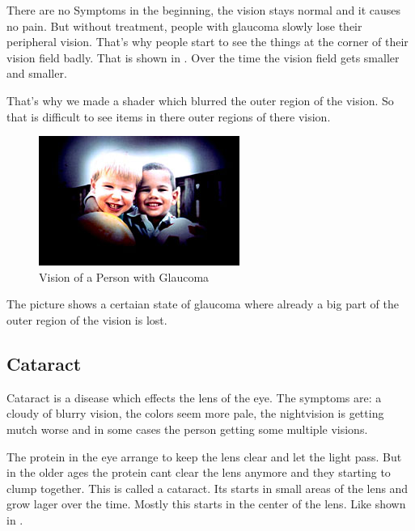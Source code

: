 \documentclass{sig-alternate-05-2015}
\begin{document}
There are no Symptoms in the beginning, the vision stays normal and it causes no pain. But without treatment, people with glaucoma slowly lose their peripheral vision. That's why people start to see the things at the corner of their vision field badly. That is shown in . Over the time the vision field gets smaller and smaller.~\cite{glaucomafacts}

That's why we made a shader which blurred the outer region of the vision. So that is difficult to see items in there outer regions of there vision.



\begin{figure}
    \centering
    \includegraphics[width=\columnwidth]{glaucomavision.png}
    \caption{Vision of a Person with Glaucoma}
    \label{fig:glaucoma}
\end{figure}

The picture  shows a certaian state of glaucoma where already a big part of the outer region of the vision is lost.

\subsection{Cataract}

Cataract is a disease which effects the lens of the eye. The symptoms are: a cloudy of blurry vision, the colors seem more pale, the nightvision is getting mutch worse and in some cases the person getting some multiple visions.

The protein in the eye arrange to keep the lens clear and let the light pass. But in the older ages the protein cant clear the lens anymore and they starting to clump together. This is called a cataract. Its starts in small areas of the lens and grow lager over the time. Mostly this starts in the center of the lens. Like shown in .
\end{document}
